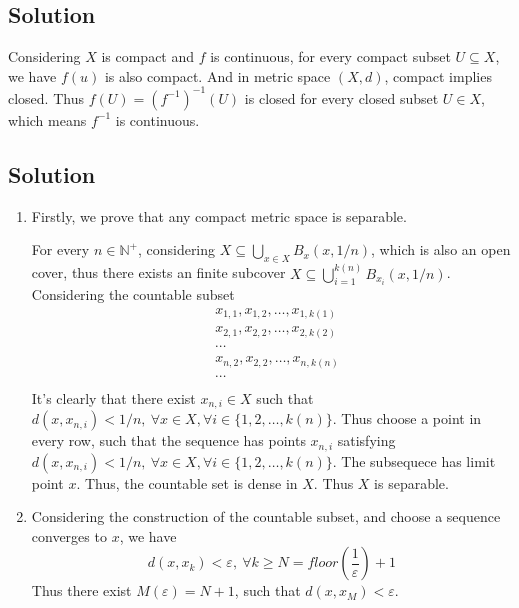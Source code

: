 \documentclass{article}
\begin{document}
\subsection{Solution}

Considering \(X\) is compact and \(f\) is continuous, for every compact subset \(U \subseteq X\), we have \(f(u)\) is also compact. And in metric space \((X, d)\), compact implies closed. Thus \(f(U) = {(f^{-1})}^{-1} (U)\) is closed for every closed subset \(U \in X\), which means $f^{-1}$ is continuous.

\subsection{Solution}
\begin{enumerate}
    \item Firstly, we prove that any compact metric space is separable.
    
    For every \(n \in \mathbb N^+\), considering \(X \subseteq \bigcup_{x \in X}B_x(x, 1/n)\), which is also an open cover, thus there exists an finite subcover \(X \subseteq \bigcup_{i = 1}^{k(n)} B_{x_i}(x, 1/n)\). Considering the countable subset 
    \begin{align*}
        &x_{1, 1}, x_{1, 2}, \ldots, x_{1, k(1)}\\
        &x_{2, 1}, x_{2, 2}, \ldots, x_{2, k(2)}\\
        &\cdots\\
        &x_{n, 2}, x_{2, 2}, \ldots, x_{n, k(n)}\\
        &\cdots\\
    \end{align*}
    It's clearly that there exist \(x_{n, i} \in X\) such that \(d(x, x_{n, i}) < 1/n,\ \forall x \in X, \forall i \in \{1, 2, \ldots, k(n)\}\). Thus choose a point in every row, such that the sequence has points \(x_{n, i}\) satisfying \(d(x, x_{n, i}) < 1/n,\ \forall x \in X, \forall i \in \{1, 2, \ldots, k(n)\}\). The subsequece has limit point \(x\). Thus, the countable set is dense in \(X\). Thus \(X\) is separable.

    \item Considering the construction of the countable subset, and choose a sequence converges to \(x\), we have
    \[d(x, x_k) < \varepsilon,\ \forall k \ge N = floor(\frac{1}{\varepsilon}) + 1\]
    Thus there exist \(M(\varepsilon) = N + 1\), such that \(d(x, x_M) < \varepsilon\).
    
\end{enumerate}
\end{document}

